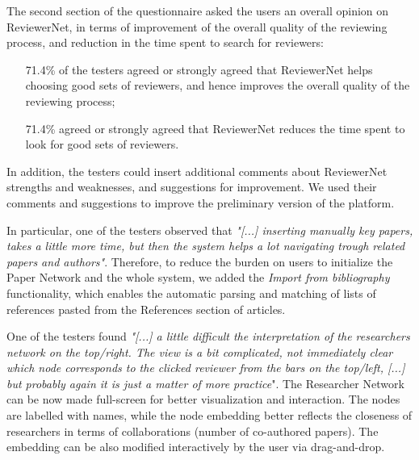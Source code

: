 The second section of the questionnaire asked the users an overall opinion on ReviewerNet, in terms of improvement of the overall quality of the reviewing process, and reduction in the time spent to search for reviewers:  %
%
\begin{itemize}
\item [71.4\%] of the testers agreed or strongly agreed that ReviewerNet helps choosing good sets of reviewers, and hence improves the overall quality of the reviewing process;
\item [71.4\%] agreed or strongly agreed that ReviewerNet reduces the time spent to look for good sets of reviewers. 
\end{itemize}

In addition, the testers could insert additional comments about ReviewerNet strengths and weaknesses, and suggestions for improvement. We used their comments and suggestions to improve the preliminary version of the platform.

In particular, one of the testers observed that {\em "[...] inserting manually key papers, takes a little more time, but then the system helps a lot navigating trough related papers and authors"}. Therefore, to reduce the burden on users to initialize the Paper Network and the whole system, we added the \emph{Import from bibliography} functionality, which enables the automatic parsing and matching of lists of references pasted from the References section of articles.

One of the testers found  {\em "[...] a little difficult the interpretation of the researchers network on the top/right. The view is a bit complicated, not immediately clear which node corresponds to the clicked reviewer from the bars on the top/left,
[...] but probably again it is just a matter of more practice}". The Researcher Network can be now made full-screen for better visualization and interaction. The nodes are labelled with names, while the node embedding better reflects the closeness of researchers in terms of collaborations (number of co-authored papers). The embedding can be also modified interactively by the user via drag-and-drop.

